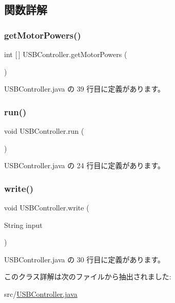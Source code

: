 \subsection{関数詳解}
\mbox{\label{class_u_s_b_controller_abd4b47f1e86159dfd7ab01ad28f21b40}} 
\subsubsection{\texorpdfstring{getMotorPowers()}{getMotorPowers()}}
{\footnotesize\ttfamily int \mbox{[}$\,$\mbox{]} U\+S\+B\+Controller.\+get\+Motor\+Powers (\begin{DoxyParamCaption}{ }\end{DoxyParamCaption})\hspace{0.3cm}{\ttfamily [inline]}}



 U\+S\+B\+Controller.\+java の 39 行目に定義があります。

\mbox{\label{class_u_s_b_controller_a3764a01faaee1b82985a787c44a4dab1}} 
\subsubsection{\texorpdfstring{run()}{run()}}
{\footnotesize\ttfamily void U\+S\+B\+Controller.\+run (\begin{DoxyParamCaption}{ }\end{DoxyParamCaption})\hspace{0.3cm}{\ttfamily [inline]}}



 U\+S\+B\+Controller.\+java の 24 行目に定義があります。

\mbox{\label{class_u_s_b_controller_afe8a9c9fdb005132410e327153c984f4}} 
\subsubsection{\texorpdfstring{write()}{write()}}
{\footnotesize\ttfamily void U\+S\+B\+Controller.\+write (\begin{DoxyParamCaption}\item[{String}]{input }\end{DoxyParamCaption})\hspace{0.3cm}{\ttfamily [inline]}}



 U\+S\+B\+Controller.\+java の 30 行目に定義があります。



このクラス詳解は次のファイルから抽出されました\+:\begin{DoxyCompactItemize}
\item 
src/\mbox{\hyperlink{_u_s_b_controller_8java}{U\+S\+B\+Controller.\+java}}\end{DoxyCompactItemize}
